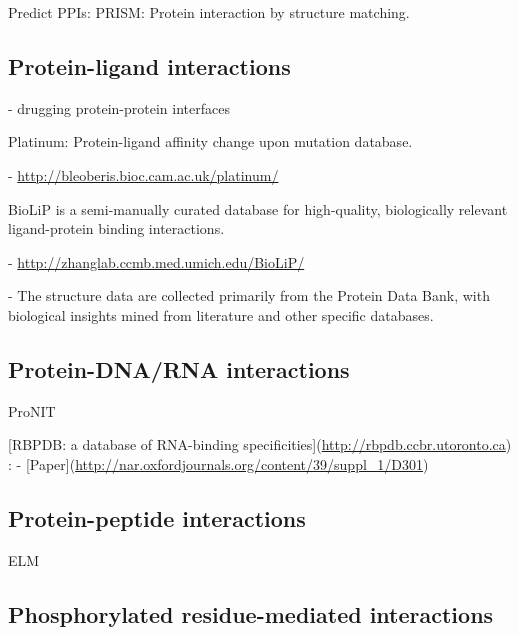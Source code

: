 Predict PPIs: PRISM: Protein interaction by structure matching.


\subsection{Protein-ligand interactions}

- drugging protein-protein interfaces \cite{wells_reaching_2007}

Platinum: Protein-ligand affinity change upon mutation database.

  - \url{http://bleoberis.bioc.cam.ac.uk/platinum/}

BioLiP is a semi-manually curated database for high-quality, biologically relevant ligand-protein binding interactions.

  - \url{http://zhanglab.ccmb.med.umich.edu/BioLiP/}

  - The structure data are collected primarily from the Protein Data Bank, with biological insights mined from literature and other specific databases.


\subsection{Protein-DNA/RNA interactions}

ProNIT

[RBPDB: a database of RNA-binding specificities](\url{http://rbpdb.ccbr.utoronto.ca})
: - [Paper](\url{http://nar.oxfordjournals.org/content/39/suppl_1/D301})


\subsection{Protein-peptide interactions}

ELM


\subsection{Phosphorylated residue-mediated interactions}
